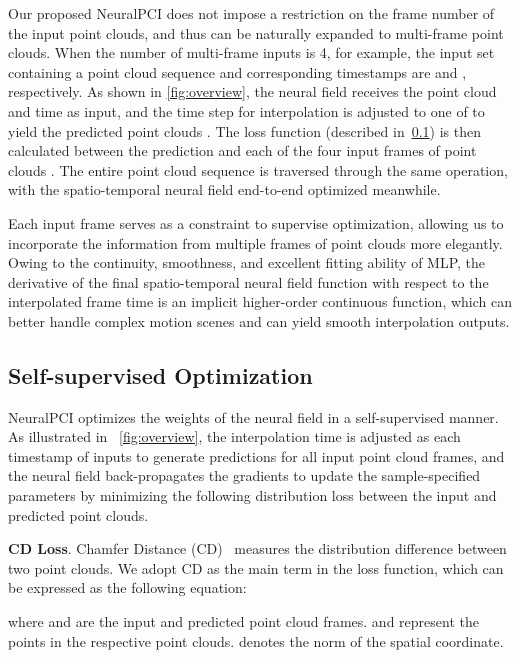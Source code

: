 \documentclass[10pt,twocolumn,letterpaper]{article}
\begin{document}
Our proposed NeuralPCI does not impose a restriction on the frame number of the input point clouds, and thus can be naturally expanded to multi-frame point clouds. When the number of multi-frame inputs is 4, for example, the input set containing a point cloud sequence and corresponding timestamps are  and , respectively. As shown in \cref{fig:overview}, the neural field receives the point cloud  and time  as input, and the time step for interpolation  is adjusted to one of  to yield the predicted point clouds . The loss function (described in~\cref{sec: self-supervised optimization}) is then calculated between the prediction and each of the four input frames of point clouds . The entire point cloud sequence is traversed through the same operation, with the spatio-temporal neural field end-to-end optimized meanwhile.

Each input frame serves as a constraint to supervise optimization, allowing us to incorporate the information from multiple frames of point clouds more elegantly. Owing to the continuity, smoothness, and excellent fitting ability of MLP, the derivative of the final spatio-temporal neural field function with respect to the interpolated frame time  is an implicit higher-order continuous function, which can better handle complex motion scenes and can yield smooth interpolation outputs.


  
\subsection{Self-supervised Optimization}  
\label{sec: self-supervised optimization}  
NeuralPCI optimizes the weights of the neural field in a self-supervised manner. As illustrated in ~\cref{fig:overview}, the interpolation time is adjusted as each timestamp of inputs to generate predictions for all input point cloud frames, and the neural field back-propagates the gradients to update the sample-specified parameters by minimizing the following distribution loss between the input and predicted point clouds.

\textbf{CD Loss}. Chamfer Distance (CD)~\cite{fan2017point} measures the distribution difference between two point clouds. We adopt CD as the main term in the loss function, which can be expressed as the following equation:  
\vspace{-.05cm}
\begin{small}

\end{small}
\vspace{-.05cm}
\noindent where  and  are the input and predicted point cloud frames.  and  represent the points in the respective point clouds.  denotes the  norm of the spatial coordinate.  
\end{document}
